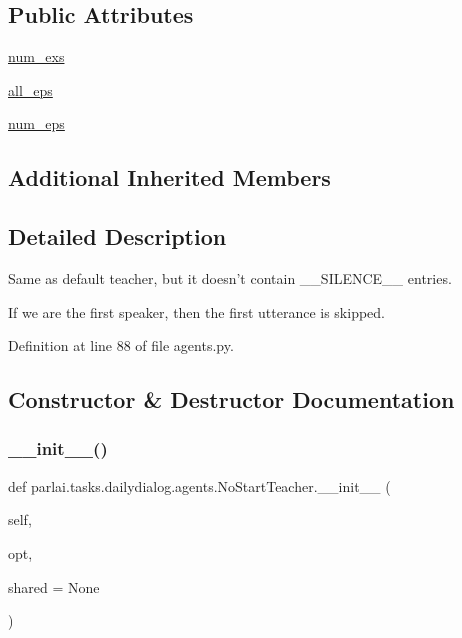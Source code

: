\subsection*{Public Attributes}
\begin{DoxyCompactItemize}
\item 
\hyperlink{classparlai_1_1tasks_1_1dailydialog_1_1agents_1_1NoStartTeacher_aab39a1a4cec18469e61f2431e85b6fd1}{num\+\_\+exs}
\item 
\hyperlink{classparlai_1_1tasks_1_1dailydialog_1_1agents_1_1NoStartTeacher_adb1dd6164639fbe3d4bf53a26f0431ee}{all\+\_\+eps}
\item 
\hyperlink{classparlai_1_1tasks_1_1dailydialog_1_1agents_1_1NoStartTeacher_ac31b7ae1fa0c534af1530fe395d90252}{num\+\_\+eps}
\end{DoxyCompactItemize}
\subsection*{Additional Inherited Members}


\subsection{Detailed Description}
\begin{DoxyVerb}Same as default teacher, but it doesn't contain __SILENCE__ entries.

If we are the first speaker, then the first utterance is skipped.
\end{DoxyVerb}
 

Definition at line 88 of file agents.\+py.



\subsection{Constructor \& Destructor Documentation}
\mbox{\label{classparlai_1_1tasks_1_1dailydialog_1_1agents_1_1NoStartTeacher_aa9ca29c5550b1ec3fe80c7254e36aead}} 
\subsubsection{\texorpdfstring{\+\_\+\+\_\+init\+\_\+\+\_\+()}{\_\_init\_\_()}}
{\footnotesize\ttfamily def parlai.\+tasks.\+dailydialog.\+agents.\+No\+Start\+Teacher.\+\_\+\+\_\+init\+\_\+\+\_\+ (\begin{DoxyParamCaption}\item[{}]{self,  }\item[{}]{opt,  }\item[{}]{shared = {\ttfamily None} }\end{DoxyParamCaption})}



